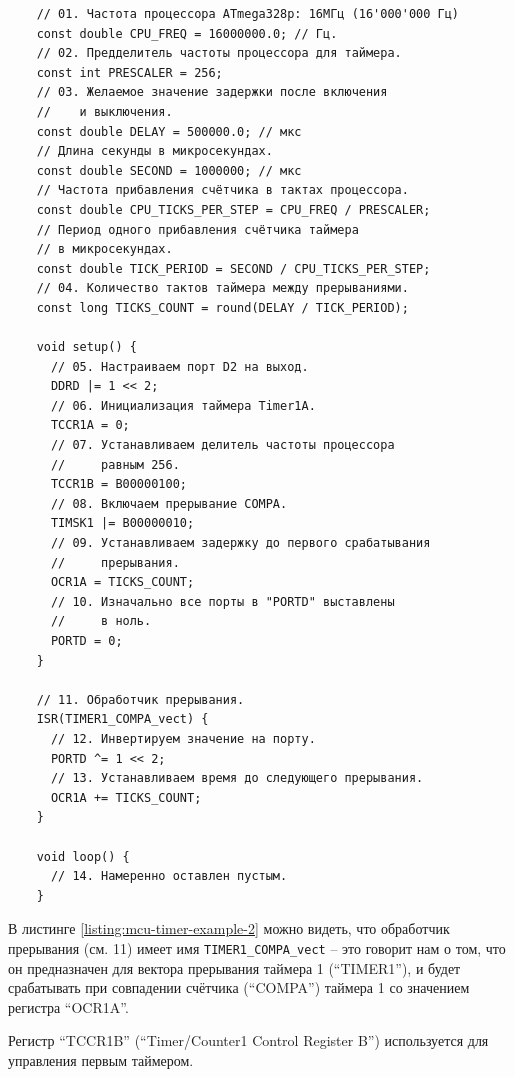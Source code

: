 \documentclass[../sparc.tex]{subfiles}
\begin{document}
\begin{listing}[ht]
  \begin{verbatim}
    // 01. Частота процессора ATmega328p: 16МГц (16'000'000 Гц)
    const double CPU_FREQ = 16000000.0; // Гц.
    // 02. Предделитель частоты процессора для таймера.
    const int PRESCALER = 256;
    // 03. Желаемое значение задержки после включения
    //    и выключения.
    const double DELAY = 500000.0; // мкс
    // Длина секунды в микросекундах.
    const double SECOND = 1000000; // мкс
    // Частота прибавления счётчика в тактах процессора.
    const double CPU_TICKS_PER_STEP = CPU_FREQ / PRESCALER;
    // Период одного прибавления счётчика таймера
    // в микросекундах.
    const double TICK_PERIOD = SECOND / CPU_TICKS_PER_STEP;
    // 04. Количество тактов таймера между прерываниями.
    const long TICKS_COUNT = round(DELAY / TICK_PERIOD);

    void setup() {
      // 05. Настраиваем порт D2 на выход.
      DDRD |= 1 << 2;
      // 06. Инициализация таймера Timer1A.
      TCCR1A = 0;
      // 07. Устанавливаем делитель частоты процессора
      //     равным 256.
      TCCR1B = B00000100;
      // 08. Включаем прерывание COMPA.
      TIMSK1 |= B00000010;
      // 09. Устанавливаем задержку до первого срабатывания
      //     прерывания.
      OCR1A = TICKS_COUNT;
      // 10. Изначально все порты в "PORTD" выставлены
      //     в ноль.
      PORTD = 0;
    }

    // 11. Обработчик прерывания.
    ISR(TIMER1_COMPA_vect) {
      // 12. Инвертируем значение на порту.
      PORTD ^= 1 << 2;
      // 13. Устанавливаем время до следующего прерывания.
      OCR1A += TICKS_COUNT;
    }

    void loop() {
      // 14. Намеренно оставлен пустым.
    }
  \end{verbatim}
  \caption{Пример мигания светодиодом по переполнению таймера для Arduino Nano
    (ATmega328p.)}
  \label{listing:mcu-timer-example-2}
\end{listing}

В листинге \ref{listing:mcu-timer-example-2} можно видеть, что обработчик
прерывания (см. 11) имеет имя \texttt{TIMER1_COMPA_vect} -- это говорит
нам о том, что он предназначен для вектора прерывания таймера 1 (``TIMER1''), и
будет срабатывать при совпадении счётчика (``COMPA'') таймера 1 со значением
регистра ``OCR1A''.


Регистр ``TCCR1B'' (``Timer/Counter1 Control Register B'') используется для
управления первым таймером.
\end{document}

